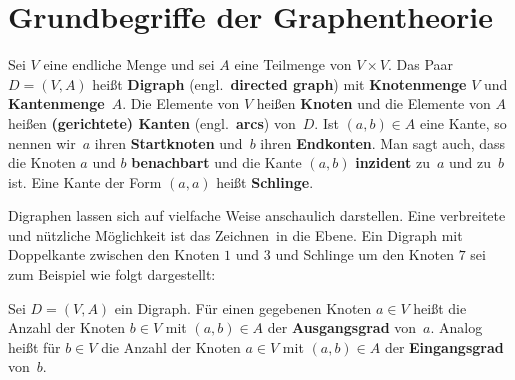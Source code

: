 


\section{Grundbegriffe der Graphentheorie}

\begin{defn}
Sei $V$ eine endliche Menge und sei $A$ eine Teilmenge von $V \times V$.
Das Paar $D=(V,A)$ heißt \textbf{Digraph} (engl.~\textbf{directed graph}) mit \textbf{Knotenmenge} $V$ und \textbf{Kantenmenge}~$A$.
Die Elemente von $V$ heißen \textbf{Knoten} und die Elemente von $A$ heißen \textbf{(gerichtete) Kanten} (engl.~\textbf{arcs}) von~$D$.
Ist $(a,b) \in A$ eine Kante, so nennen wir~$a$ ihren \textbf{Startknoten} und~$b$ ihren \textbf{Endkonten}.
Man sagt auch, dass die Knoten $a$ und $b$ \textbf{benachbart} und die Kante $(a,b)$ \textbf{inzident} zu~$a$ und zu~$b$ ist.
Eine Kante der Form $(a,a)$ heißt \textbf{Schlinge}.
\end{defn}

\begin{bsp} 
Digraphen lassen sich auf vielfache Weise anschaulich darstellen.
Eine verbreitete und nützliche Möglichkeit ist das \glqq Zeichnen\grqq\ in die Ebene.
Ein Digraph mit Doppelkante zwischen den Knoten $1$ und $3$ und Schlinge um den Knoten $7$ sei zum Beispiel wie folgt dargestellt:\\

\begin{center}
\end{center}
\end{bsp} 

\begin{defn}
Sei $D = (V,A)$ ein Digraph.
Für einen gegebenen Knoten $a \in V$ heißt die Anzahl der Knoten $b \in V$ mit $(a,b) \in A$ der \textbf{Ausgangsgrad} von~$a$.
Analog heißt für $b \in V$ die Anzahl der Knoten $a \in V$ mit $(a,b) \in A$ der \textbf{Eingangsgrad} von~$b$.
\end{defn} 

